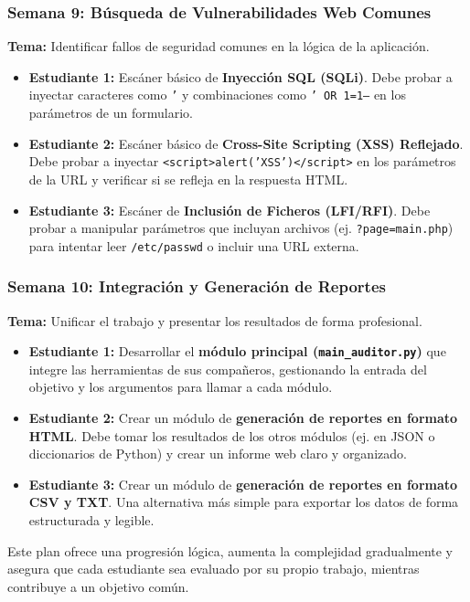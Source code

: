 \documentclass{article}
\begin{document}
\subsubsection*{Semana 9: Búsqueda de Vulnerabilidades Web Comunes}
\textbf{Tema:} Identificar fallos de seguridad comunes en la lógica de la aplicación.
\begin{itemize}
    \item \textbf{Estudiante 1:} Escáner básico de \textbf{Inyección SQL (SQLi)}. Debe probar a inyectar caracteres como \texttt{'} y combinaciones como \texttt{' OR 1=1--} en los parámetros de un formulario.
    \item \textbf{Estudiante 2:} Escáner básico de \textbf{Cross-Site Scripting (XSS) Reflejado}. Debe probar a inyectar \texttt{<script>alert('XSS')</script>} en los parámetros de la URL y verificar si se refleja en la respuesta HTML.
    \item \textbf{Estudiante 3:} Escáner de \textbf{Inclusión de Ficheros (LFI/RFI)}. Debe probar a manipular parámetros que incluyan archivos (ej. \texttt{?page=main.php}) para intentar leer \texttt{/etc/passwd} o incluir una URL externa.
\end{itemize}

\subsubsection*{Semana 10: Integración y Generación de Reportes}
\textbf{Tema:} Unificar el trabajo y presentar los resultados de forma profesional.
\begin{itemize}
    \item \textbf{Estudiante 1:} Desarrollar el \textbf{módulo principal (\texttt{main\_auditor.py})} que integre las herramientas de sus compañeros, gestionando la entrada del objetivo y los argumentos para llamar a cada módulo.
    \item \textbf{Estudiante 2:} Crear un módulo de \textbf{generación de reportes en formato HTML}. Debe tomar los resultados de los otros módulos (ej. en JSON o diccionarios de Python) y crear un informe web claro y organizado.
    \item \textbf{Estudiante 3:} Crear un módulo de \textbf{generación de reportes en formato CSV y TXT}. Una alternativa más simple para exportar los datos de forma estructurada y legible.
\end{itemize}

Este plan ofrece una progresión lógica, aumenta la complejidad gradualmente y asegura que cada estudiante sea evaluado por su propio trabajo, mientras contribuye a un objetivo común.
\end{document}
